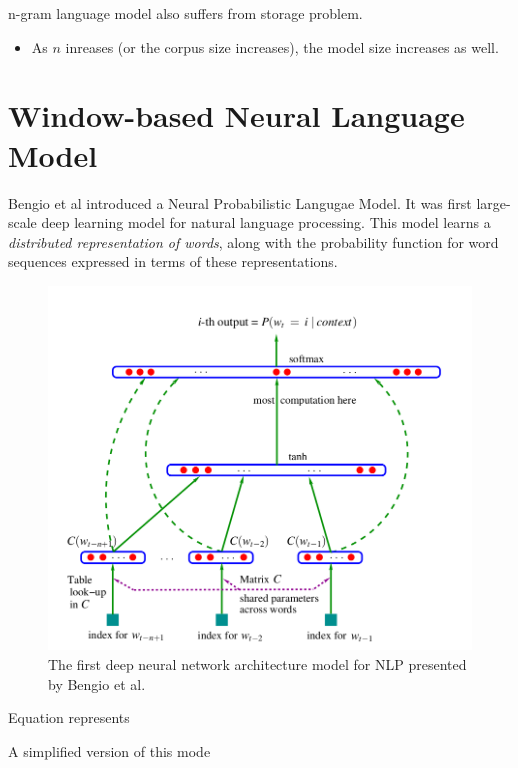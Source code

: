 \documentclass[letterpaper]{article}
\begin{document}
n-gram language model also suffers from storage problem.
\begin{itemize}
	\item As $n$ inreases (or the corpus size increases), the model size increases
	as well.
\end{itemize}

\section{Window-based Neural Language Model}
Bengio et al introduced a Neural Probabilistic Langugae Model. It was
first large-scale deep learning model for natural language processing.
This model learns a \textit{distributed representation of words}, along
with the probability function for word sequences expressed in terms of
these representations.

\begin{figure}
	\includegraphics[scale=0.5]{images/Neural_Language_Model.png}
	\caption{The first deep neural network architecture model
	for NLP presented by Bengio et al.}
\end{figure}


Equation represents 

A simplified version of this mode
\end{document}
